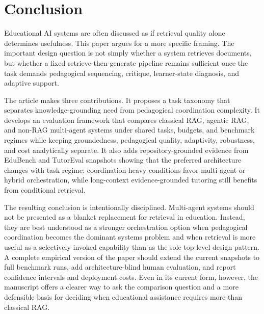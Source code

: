 \section{Conclusion}

Educational AI systems are often discussed as if retrieval quality alone determines usefulness. This paper argues for a more specific framing. The important design question is not simply whether a system retrieves documents, but whether a fixed retrieve-then-generate pipeline remains sufficient once the task demands pedagogical sequencing, critique, learner-state diagnosis, and adaptive support.

The article makes three contributions. It proposes a task taxonomy that separates knowledge-grounding need from pedagogical coordination complexity. It develops an evaluation framework that compares classical RAG, agentic RAG, and non-RAG multi-agent systems under shared tasks, budgets, and benchmark regimes while keeping groundedness, pedagogical quality, adaptivity, robustness, and cost analytically separate. It also adds repository-grounded evidence from EduBench and TutorEval snapshots showing that the preferred architecture changes with task regime: coordination-heavy conditions favor multi-agent or hybrid orchestration, while long-context evidence-grounded tutoring still benefits from conditional retrieval.

The resulting conclusion is intentionally disciplined. Multi-agent systems should not be presented as a blanket replacement for retrieval in education. Instead, they are best understood as a stronger orchestration option when pedagogical coordination becomes the dominant systems problem and when retrieval is more useful as a selectively invoked capability than as the sole top-level design pattern. A complete empirical version of the paper should extend the current snapshots to full benchmark runs, add architecture-blind human evaluation, and report confidence intervals and deployment costs. Even in its current form, however, the manuscript offers a clearer way to ask the comparison question and a more defensible basis for deciding when educational assistance requires more than classical RAG.
